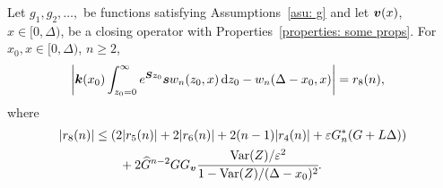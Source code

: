 \begin{cor}\label{cor: ahjg}
	Let \(g_1,g_2,\dots,\) be functions satisfying Assumptions~\ref{asu: g} and let \({\boldsymbol v}(x)\), \(x\in[0,\Delta)\), be a closing operator with Properties~\ref{properties: some props}. For \(x_0,x\in\mathcal [0,\Delta)\), \(n\geq 2\), 
	\begin{align}
		&\left|\boldsymbol k(x_0) \int_{z_0=0}^\infty e^{\boldsymbol Sz_0}\boldsymbol sw_n(z_0,x)\, \mathrm{d} z_0 - w_n(\Delta - x_0,x) \right| \nonumber
		= r_8(n),
	\end{align}
	where 
	\begin{align*}
		|r_8(n)|&\leq  \left( 2|r_5(n)| + 2|r_6(n)| + 2(n-1)|r_4(n)| + \varepsilon G_n^{*}(G+L\Delta) \right) \\&\qquad{}+ 2\widehat G^{n-2}GG_{\boldsymbol v}\cfrac{\mathrm{Var}(Z)/\varepsilon^2}{1-\mathrm{Var}(Z)/(\Delta-x_0)^2}.
	\end{align*}
\end{cor}
